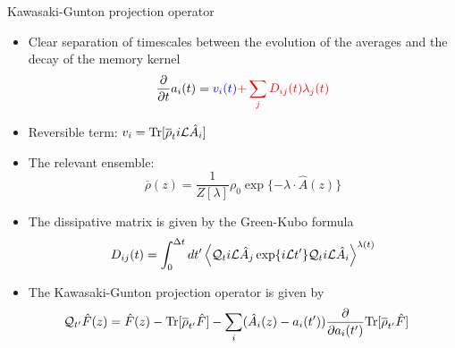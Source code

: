 \documentclass{beamer}
\begin{document}
\begin{frame}{Kawasaki-Gunton projection operator}
  \begin{itemize}
     \item Clear separation of timescales between the evolution of the averages and the decay of the memory kernel 
\begin{equation}
  \frac{\partial}{\partial t}a_i(t) = {\color{blue} v_i(t)} {\color{red} +\sum_j D_{ij}(t) \lambda_j(t)}
\nonumber
\end{equation}
\item {\color{blue} Reversible term}: $v_i={\rm Tr}[\overline{\rho}_t i{\cal L}\hat{A}_i]$ 
\item The relevant ensemble: 
  \begin{equation}
  \overline{\rho}(z) = \frac{1}{Z[\lambda]} \rho_0\exp\{-\lambda\!\cdot\!\hat{A}(z)\}
  \nonumber
  \end{equation}
\item {\color{red} The  dissipative matrix}  is  given  by  the Green-Kubo  formula
\begin{equation}
D_{ij}(t)=\int_0^{\Delta t} dt'\left\langle 
{\cal Q}_t i{\cal L}\hat{A}_j\exp\{i{\cal L}t'\}{\cal Q}_t i{\cal L}\hat{A}_i
\right\rangle^{\lambda(t)}
\label{dij}
\nonumber
\end{equation}
\item The Kawasaki-Gunton projection operator is given by 
  \begin{align}
    {\cal Q}_{t'}\hat{F}(z) &= \hat{F}(z)- {\rm Tr}[\overline{\rho}_{t'} \hat{F}]
  -\sum_i(\hat{A}_i(z)-a_i(t'))\frac{\partial }{\partial a_i(t')}
  {\rm Tr}[\overline{\rho}_{t'} \hat{F}]
  \label{Q}
  \nonumber
  \end{align}
\end{itemize}
\end{frame}
\end{document}
